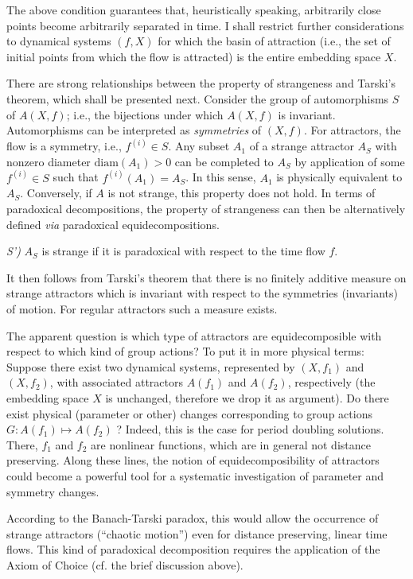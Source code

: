 The above condition guarantees that, heuristically speaking, arbitrarily
close points become arbitrarily separated in time.
I shall restrict further considerations to dynamical systems $(f,X)$ for
which
the basin of attraction (i.e., the set of initial points from which the
flow is attracted)
is the entire embedding space $X$.


There are strong relationships between the property of strangeness
and Tarski's theorem, which shall be presented next.
Consider the group of automorphisms $S$ of $A(X,f)$; i.e., the
bijections under which $A(X,f)$ is invariant.
Automorphisms can be interpreted
 as  {\em symmetries} of $(X,f)$.
 For attractors, the flow is a symmetry, i.e., $f^{(i)}\in S$.
Any subset $A_1$ of a strange attractor $A_S$
with nonzero diameter $\mbox{diam}(A_1)>0$ can be completed to $A_S$ by
application of some $f^{(i)}\in S$ such that $f^{(i)}(A_1)=A_S$. In this
 sense,
$A_1$ is physically equivalent to $A_S$.
Conversely, if $A$ is not strange, this property does not hold.
 In terms of paradoxical decompositions,
 the property of strangeness can then be alternatively defined {\it
 via} paradoxical equidecompositions.

 {\it S')}
 $A_S$ is strange if it is paradoxical with respect to the time flow
 $f$.

It then follows from
Tarski's theorem \cite{f1} that
there is no finitely additive measure on strange attractors
which is invariant with respect to the symmetries (invariants)
of motion. For regular attractors such a measure exists.


      The apparent question is which type of attractors are
 equidecomposible with respect to which kind of group actions?  To put
 it in more physical terms: Suppose there exist two dynamical systems,
 represented by $(X,f_1)$ and $(X,f_2)$, with associated attractors
 $A(f_1)$ and $A(f_2)$, respectively (the embedding space $X$ is
 unchanged, therefore we drop it as argument).  Do there exist physical
 (parameter or other) changes corresponding to group actions
 $G:A(f_1)\mapsto A(f_2)$ ?  Indeed, this is the case for period
 doubling solutions.  There, $f_1$ and $f_2$ are nonlinear functions,
 which are in general not distance preserving.  Along these lines, the
 notion of equidecomposibility of attractors could become a powerful
 tool for a systematic investigation of parameter and symmetry changes.



According to the
 Banach-Tarski paradox,
this would allow the occurrence of strange attractors (``chaotic
motion'') even for
 distance preserving, linear time flows.
 This kind of paradoxical decomposition requires the application of the
Axiom of Choice (cf. the brief discussion above).

